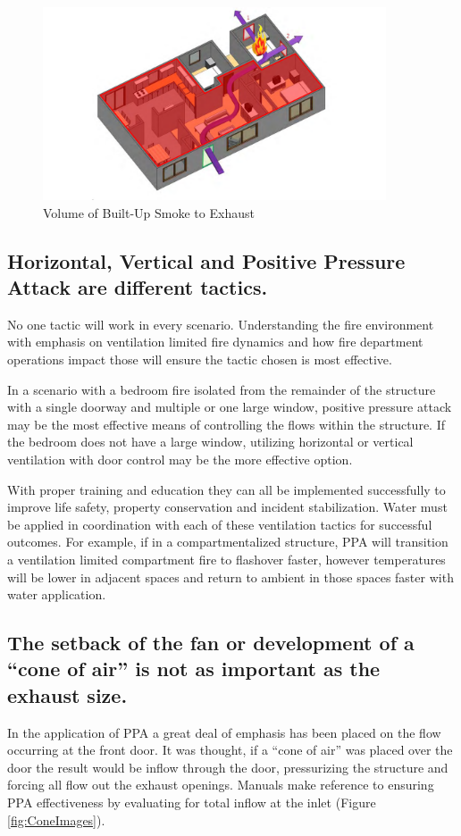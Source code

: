 \documentclass{article}
\begin{document}
\begin{figure}[H]
	\centering
	\includegraphics[width = 4in ]{0_Images/Tactical_Considerations/Understanding_Basics/SmokeToBeExhausted.pdf}
	\caption{Volume of Built-Up Smoke to Exhaust}
	\label{fig:SmokeToExhaust}
\end{figure}

\subsection{Horizontal, Vertical and Positive Pressure Attack are different tactics.} 
No one tactic will work in every scenario. Understanding the fire environment with emphasis on ventilation limited fire dynamics and how fire department operations impact those will ensure the tactic chosen is most effective.

In a scenario with a bedroom fire isolated from the remainder of the structure with a single doorway and multiple or one large window, positive pressure attack may be the most effective means of controlling the flows within the structure. If the bedroom does not have a large window, utilizing horizontal or vertical ventilation with door control may be the more effective option. 

With proper training and education they can all be implemented successfully to improve life safety, property conservation and incident stabilization.  Water must be applied in coordination with each of these ventilation tactics for successful outcomes.   For example, if in a compartmentalized structure, PPA will transition a ventilation limited compartment fire to flashover faster, however temperatures will be lower in adjacent spaces and return to ambient in those spaces faster with water application.

\subsection{The setback of the fan or development of a “cone of air” is not as important as the exhaust size.}
In the application of PPA a great deal of emphasis has been placed on the flow occurring at the front door. It was thought, if a ``cone of air'' was placed over the door the result would be inflow through the door, pressurizing the structure and forcing all flow out the exhaust openings. Manuals make reference to ensuring PPA effectiveness by evaluating for total inflow at the inlet (Figure \ref{fig:ConeImages}).
\end{document}

